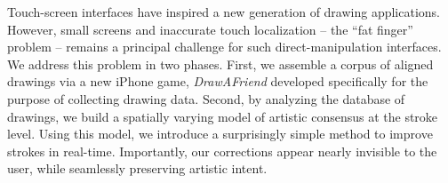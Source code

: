 Touch-screen interfaces have inspired a new generation of drawing
applications. However, small screens and inaccurate touch
localization -- the ``fat finger'' problem -- remains a principal
challenge for such direct-manipulation interfaces. We address this
problem in two phases. First, we assemble a corpus of aligned
drawings via a new iPhone game, {\em DrawAFriend} developed specifically for the
purpose of collecting drawing data. Second, by analyzing the
database of drawings, we build a spatially varying model of artistic
consensus at the stroke level. Using this model, we introduce a
surprisingly simple method to improve strokes in real-time.
Importantly, our corrections appear nearly invisible to the user,
while seamlessly preserving artistic intent.